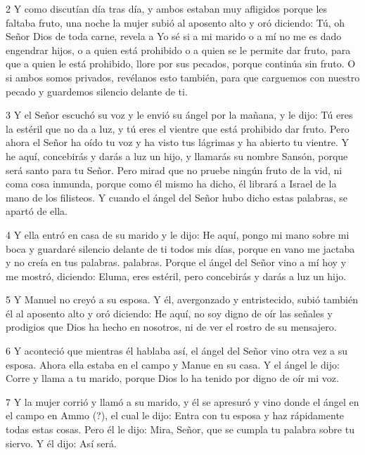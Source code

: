 \par 2 Y como discutían día tras día, y ambos estaban muy afligidos porque les faltaba fruto, una noche la mujer subió al aposento alto y oró diciendo: Tú, oh Señor Dios de toda carne, revela a Yo sé si a mi marido o a mí no me es dado engendrar hijos, o a quien está prohibido o a quien se le permite dar fruto, para que a quien le está prohibido, llore por sus pecados, porque continúa sin fruto. O si ambos somos privados, revélanos esto también, para que carguemos con nuestro pecado y guardemos silencio delante de ti.

\par 3 Y el Señor escuchó su voz y le envió su ángel por la mañana, y le dijo: Tú eres la estéril que no da a luz, y tú eres el vientre que está prohibido dar fruto. Pero ahora el Señor ha oído tu voz y ha visto tus lágrimas y ha abierto tu vientre. Y he aquí, concebirás y darás a luz un hijo, y llamarás su nombre Sansón, porque será santo para tu Señor. Pero mirad que no pruebe ningún fruto de la vid, ni coma cosa inmunda, porque como él mismo ha dicho, él librará a Israel de la mano de los filisteos. Y cuando el ángel del Señor hubo dicho estas palabras, se apartó de ella.

\par 4 Y ella entró en casa de su marido y le dijo: He aquí, pongo mi mano sobre mi boca y guardaré silencio delante de ti todos mis días, porque en vano me jactaba y no creía en tus palabras. palabras. Porque el ángel del Señor vino a mí hoy y me mostró, diciendo: Eluma, eres estéril, pero concebirás y darás a luz un hijo.

\par 5 Y Manuel no creyó a su esposa. Y él, avergonzado y entristecido, subió también él al aposento alto y oró diciendo: He aquí, no soy digno de oír las señales y prodigios que Dios ha hecho en nosotros, ni de ver el rostro de su mensajero.

\par 6 Y aconteció que mientras él hablaba así, el ángel del Señor vino otra vez a su esposa. Ahora ella estaba en el campo y Manue en su casa. Y el ángel le dijo: Corre y llama a tu marido, porque Dios lo ha tenido por digno de oír mi voz.

\par 7 Y la mujer corrió y llamó a su marido, y él se apresuró y vino donde el ángel en el campo en Ammo (?), el cual le dijo: Entra con tu esposa y haz rápidamente todas estas cosas. Pero él le dijo: Mira, Señor, que se cumpla tu palabra sobre tu siervo. Y él dijo: Así será.

